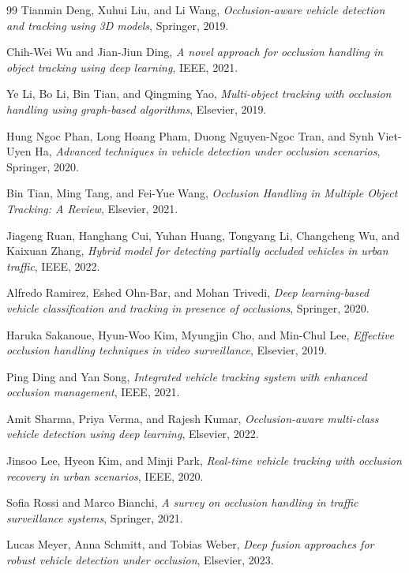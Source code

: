\documentclass[12pt,a4paper]{report}
\theoremstyle{definition}
\theoremstyle{remark}
\begin{document}
\begin{thebibliography}{99}
	Tianmin Deng, Xuhui Liu, and Li Wang,
	\emph{Occlusion-aware vehicle detection and tracking using 3D models},
	Springer, 2019.
	
	Chih-Wei Wu and Jian-Jiun Ding,
	\emph{A novel approach for occlusion handling in object tracking using deep learning},
	IEEE, 2021.
	
	Ye Li, Bo Li, Bin Tian, and Qingming Yao,
	\emph{Multi-object tracking with occlusion handling using graph-based algorithms},
	Elsevier, 2019.
	
	Hung Ngoc Phan, Long Hoang Pham, Duong Nguyen-Ngoc Tran, and Synh Viet-Uyen Ha,
	\emph{Advanced techniques in vehicle detection under occlusion scenarios},
	Springer, 2020.
	
	Bin Tian, Ming Tang, and Fei-Yue Wang,
	\emph{Occlusion Handling in Multiple Object Tracking: A Review},
	Elsevier, 2021.
	
	Jiageng Ruan, Hanghang Cui, Yuhan Huang, Tongyang Li, Changcheng Wu, and Kaixuan Zhang,
	\emph{Hybrid model for detecting partially occluded vehicles in urban traffic},
	IEEE, 2022.
	
	Alfredo Ramirez, Eshed Ohn-Bar, and Mohan Trivedi,
	\emph{Deep learning-based vehicle classification and tracking in presence of occlusions},
	Springer, 2020.
	
	Haruka Sakanoue, Hyun-Woo Kim, Myungjin Cho, and Min-Chul Lee,
	\emph{Effective occlusion handling techniques in video surveillance},
	Elsevier, 2019.
	
	Ping Ding and Yan Song,
	\emph{Integrated vehicle tracking system with enhanced occlusion management},
	IEEE, 2021.
    
	Amit Sharma, Priya Verma, and Rajesh Kumar,
	\emph{Occlusion-aware multi-class vehicle detection using deep learning},
	Elsevier, 2022.

	Jinsoo Lee, Hyeon Kim, and Minji Park,
	\emph{Real-time vehicle tracking with occlusion recovery in urban scenarios},
	IEEE, 2020.

	Sofia Rossi and Marco Bianchi,
	\emph{A survey on occlusion handling in traffic surveillance systems},
	Springer, 2021.

	Lucas Meyer, Anna Schmitt, and Tobias Weber,
	\emph{Deep fusion approaches for robust vehicle detection under occlusion},
	Elsevier, 2023.


\end{thebibliography}
\end{document}
